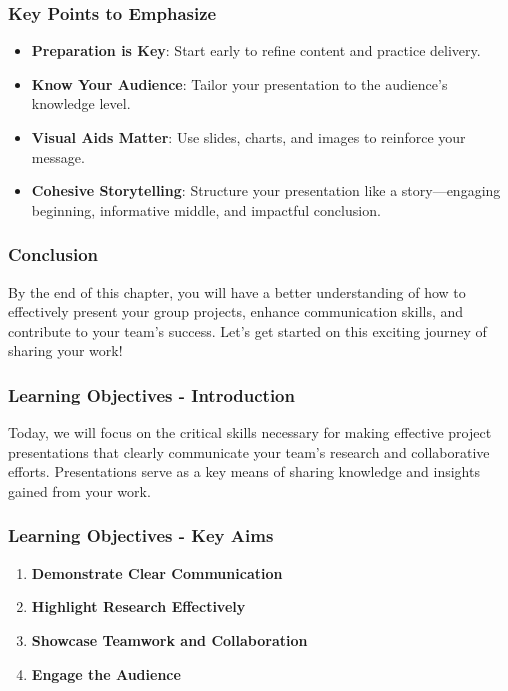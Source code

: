 \documentclass{beamer}
\begin{document}
\begin{frame}[fragile]
    \frametitle{Key Points to Emphasize}
    \begin{itemize}
        \item \textbf{Preparation is Key}: Start early to refine content and practice delivery.
        \item \textbf{Know Your Audience}: Tailor your presentation to the audience's knowledge level.
        \item \textbf{Visual Aids Matter}: Use slides, charts, and images to reinforce your message.
        \item \textbf{Cohesive Storytelling}: Structure your presentation like a story—engaging beginning, informative middle, and impactful conclusion.
    \end{itemize}
\end{frame}

\begin{frame}[fragile]
    \frametitle{Conclusion}
    By the end of this chapter, you will have a better understanding of how to effectively present your group projects, enhance communication skills, and contribute to your team’s success. Let's get started on this exciting journey of sharing your work!
\end{frame}

\begin{frame}[fragile]
    \frametitle{Learning Objectives - Introduction}
    Today, we will focus on the critical skills necessary for making effective project presentations that clearly communicate your team's research and collaborative efforts. Presentations serve as a key means of sharing knowledge and insights gained from your work.
\end{frame}

\begin{frame}[fragile]
    \frametitle{Learning Objectives - Key Aims}
    \begin{enumerate}
        \item \textbf{Demonstrate Clear Communication}
        \item \textbf{Highlight Research Effectively}
        \item \textbf{Showcase Teamwork and Collaboration}
        \item \textbf{Engage the Audience}
    \end{enumerate}
\end{frame}
\end{document}
